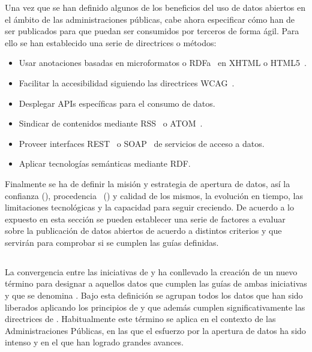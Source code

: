 Una vez que se han definido algunos de los beneficios del uso de datos abiertos en el ámbito de las
administraciones públicas, cabe ahora especificar cómo han de ser publicados para que
puedan ser consumidos por terceros de forma ágil. Para ello se han establecido una serie
de directrices o métodos:
\begin{itemize}
 \item Usar anotaciones basadas en microformatos o \gls{RDFa}~\cite{rdfa-primer} en \gls{XHTML} o \gls{HTML}5~\cite{HTML5}.
 \item Facilitar la accesibilidad siguiendo las directrices \gls{WCAG}~\cite{wcag2}.
 \item Desplegar APIs específicas para el consumo de datos.
 \item Sindicar de contenidos mediante \gls{RSS}~\cite{rss} o \gls{ATOM}~\cite{atom-rfc}.
 \item Proveer interfaces \gls{REST}~\cite{Fielding2000} o \gls{SOAP}~\cite{SOAP11} de servicios de acceso a datos.
 \item Aplicar tecnologías semánticas mediante \gls{RDF}.
\end{itemize}

Finalmente se ha de definir la misión y estrategia de apertura de datos, así la confianza (\trust), procedencia~\cite{Carroll05namedgraphs,prov-group} (\provenance) y calidad de los mismos, la
evolución en tiempo, las limitaciones tecnológicas y la capacidad para seguir creciendo. De acuerdo a lo expuesto en esta sección se pueden
establecer una serie de factores a evaluar sobre la publicación de datos abiertos de acuerdo a distintos criterios y que 
servirán para comprobar si se cumplen las guías definidas. 

\subsection{\lod}
La convergencia entre las iniciativas de \linkeddata y \opendata ha conllevado la creación
de un nuevo término para designar a aquellos datos que cumplen las guías de ambas iniciativas y que 
se denomina \lod. Bajo esta definición se agrupan todos los datos que han sido
liberados aplicando los principios de \linkeddata y que además cumplen significativamente
las directrices de \opendata. Habitualmente este término se aplica en el contexto de las Administraciones
Públicas, en las que el esfuerzo por la apertura de datos ha sido intenso y en el que han logrado grandes avances. 

